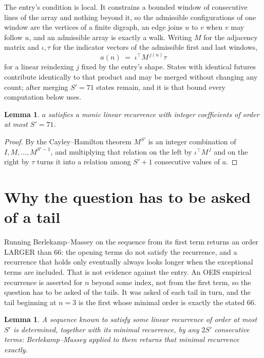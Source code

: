 \documentclass[11pt,a4paper]{article}
\theoremstyle{plain}
\newtheorem{lemma}[theorem]{Lemma}
\theoremstyle{definition}
\begin{document}
The entry's condition is local. It constrains a bounded window of consecutive lines of the
array and nothing beyond it, so the admissible configurations of one window are the vertices of
a finite digraph, an edge joins $u$ to $v$ when $v$ may follow $u$, and an admissible array is
exactly a walk. Writing $M$ for the adjacency matrix and $\iota,\tau$ for the indicator vectors
of the admissible first and last windows,
\[
a(n)\;=\;\iota^{\!\top}M^{\,j(n)}\tau
\]
for a linear reindexing $j$ fixed by the entry's shape. States with identical futures
contribute identically to that product and may be merged without changing any count; after
merging $S'=71$ states remain, and it is that bound every computation below uses.

\begin{lemma}\label{lem:cf}
$a$ satisfies a monic linear recurrence with integer coefficients of order at most $S'=71$.
\end{lemma}

\begin{proof}
By the Cayley--Hamilton theorem $M^{S'}$ is an integer combination of $I,M,\dots,M^{S'-1}$,
and multiplying that relation on the left by $\iota^{\!\top}M^{\,j}$ and on the right by
$\tau$ turns it into a relation among $S'+1$ consecutive values of $a$.
\end{proof}

\section{Why the question has to be asked of a tail}

Running Berlekamp--Massey on the sequence from its first term returns an order LARGER than $66$: the opening terms do not satisfy the recurrence, and a recurrence that holds only eventually always looks longer when the exceptional terms are included. That is not evidence against the entry. An OEIS empirical recurrence is asserted for $n$ beyond some index, not from the first term, so the question has to be asked of the tails. It was asked of each tail in turn, and the tail beginning at $n=3$ is the first whose minimal order is exactly the stated $66$.

\begin{lemma}\label{lem:bm}
A sequence known to satisfy some linear recurrence of order at most $S'$ is determined,
together with its minimal recurrence, by any $2S'$ consecutive terms: Berlekamp--Massey applied
to them returns that minimal recurrence exactly.
\end{lemma}
\end{document}
